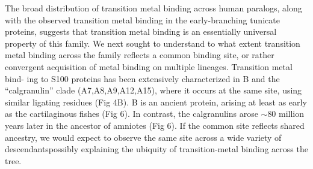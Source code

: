 The broad distribution of transition metal binding across human paralogs,
along with the observed transition metal binding in the early-branching
tunicate proteins, suggests that transition metal binding is an essentially
universal property of this family. We next sought to understand to
what extent transition metal binding across the family reflects a
common binding site, or rather convergent acquisition of metal binding
on multiple lineages. Transition metal bind- ing to S100 proteins
has been extensively characterized in B and the \textquotedblleft calgranulin\textquotedblright{}
clade (A7,A8,A9,A12,A15), where it occurs at the same site, using
similar ligating residues (Fig 4B). B is an ancient protein, arising
at least as early as the cartilaginous fishes (Fig 6). In contrast,
the calgranulins arose $\sim$80 million years later in the ancestor
of amniotes (Fig 6). If the common site reflects shared ancestry,
we would expect to observe the same site across a wide variety of
descendants\textemdash possibly explaining the ubiquity of transition-metal
binding across the tree.

